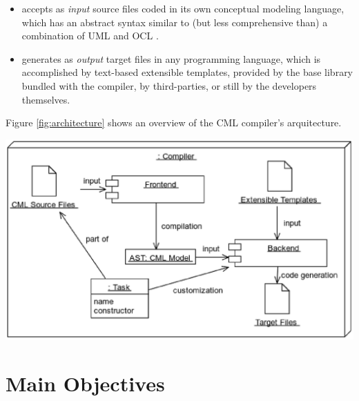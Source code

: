 \documentclass[a0,portrait]{a0poster}
\begin{document}
\begin{multicols}{3}
\begin{itemize}

\item accepts as \emph{input} source files coded
in its own conceptual modeling language,
which has an abstract syntax similar to
(but less comprehensive than)
a combination of UML \cite{uml} and OCL \cite{ocl}.

\item generates as \emph{output} target files in any programming language,
which is accomplished by text-based extensible templates,
provided by the base library bundled with the compiler,
by third-parties, or still by the developers themselves.

\end{itemize}

Figure \ref{fig:architecture} shows an overview of
the CML compiler's arquitecture.

\begin{center}
\includegraphics[width=1.0\linewidth]{figures/architecture.eps}
\label{fig:architecture}
\end{center}


\color{DarkSlateGray} %

\section*{Main Objectives}

\begin{enumerate}


\end{enumerate}
\end{multicols}
\end{document}
